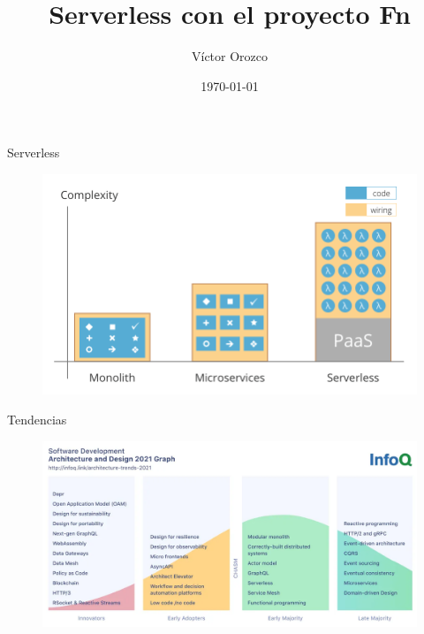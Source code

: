 \documentclass[aspectratio=169]{beamer}
\title{Serverless con el proyecto Fn}
\author{Víctor Orozco}
\institute{Nabenik}
\date{\today}
\begin{document}
{
    \frame{\titlepage}
}


\begin{frame}{Serverless}
\begin{figure}
	\centering
	\includegraphics[width=0.8\linewidth]{Images/serverlessevolution.png}
	\label{fig:kotlin}
\end{figure}
\end{frame}


\begin{frame}{Tendencias}
\begin{figure}
	\centering
	\includegraphics[width=0.9\linewidth]{Images/trends.png}
	\label{fig:trends}
\end{figure}
\end{frame}
\end{document}
